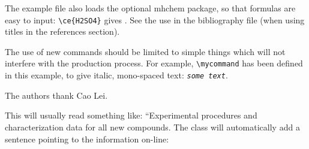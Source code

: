 \documentclass[journal=jacsat,manuscript=article]{achemso}
\newcommand*\mycommand[1]{\texttt{\emph{#1}}}
\begin{document}
The example file also loads the optional \textsf{mhchem} package, so
that formulas are easy to input: \texttt{\textbackslash ce\{H2SO4\}}
gives .  See the use in the bibliography file (when using
titles in the references section).

The use of new commands should be limited to simple things which will
not interfere with the production process.  For example,
\texttt{\textbackslash mycommand} has been defined in this example,
to give italic, mono-spaced text: \mycommand{some text}.

\begin{acknowledgement}

The authors thank Cao Lei.

\end{acknowledgement}

\begin{suppinfo}

This will usually read something like: ``Experimental procedures and
characterization data for all new compounds. The class will
automatically add a sentence pointing to the information on-line:

\end{suppinfo}


\end{document}
